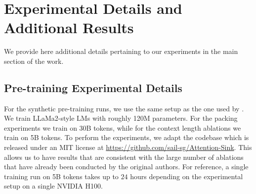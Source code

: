 \documentclass{article} %
\begin{document}














\appendix

\section{Experimental Details and Additional Results}
We provide here additional details pertaining to our experiments in the main section of the work.

\subsection{Pre-training Experimental Details}
\label{app:pretraining-details}
For the synthetic pre-training runs, we use the same setup as the one used by \cite{gu2025when}. We train LLaMa2-style LMs with roughly 120M parameters. For the packing experiments we train on 30B tokens, while for the context length ablations we train on 5B tokens. To perform the experiments, we adapt the codebase which is released under an MIT license at \url{https://github.com/sail-sg/Attention-Sink}. This allows us to have results that are consistent with the large number of ablations that have already been conducted by the original authors. For reference, a single training run on 5B tokens takes up to $24$ hours depending on the experimental setup on a single NVIDIA H100. 
\end{document}
